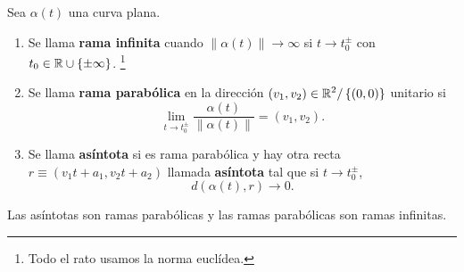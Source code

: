 \begin{definition}
Sea $\displaystyle \alpha\left(t\right) $ una curva plana.
\begin{enumerate}
	\item Se llama \textbf{rama infinita} cuando $\displaystyle \|\alpha\left(t\right)\| \to \infty $ si $\displaystyle t \to t_{0}^{\pm } $ con $\displaystyle t_{0} \in \mathbb{R} \cup \left\{ \pm \infty \right\}  $. \footnote{Todo el rato usamos la norma euclídea.} 
	\item Se llama \textbf{rama parabólica} en la dirección $\displaystyle \left(v_{1}, v_{2}\right) \in \mathbb{R}^{2} / \left\{ \left(0,0\right)\right\}  $ unitario si
		\[\lim_{t \to t_{0}^{\pm }}\frac{\alpha\left(t\right)}{\|\alpha\left(t\right)\|}=\left(v_{1}, v_{2}\right) .\]
	\item Se llama \textbf{asíntota} si es rama parabólica y hay otra recta $\displaystyle r \equiv \left(v_{1}t + a_{1}, v_{2}t + a_{2}\right) $ llamada \textbf{asíntota} tal que si $\displaystyle t \to t_{0}^{\pm } $,
		\[d\left(\alpha\left(t\right), r\right) \to 0 .\]
\end{enumerate}
\end{definition}
\begin{observation}
Las asíntotas son ramas parabólicas y las ramas parabólicas son ramas infinitas.
\end{observation}

